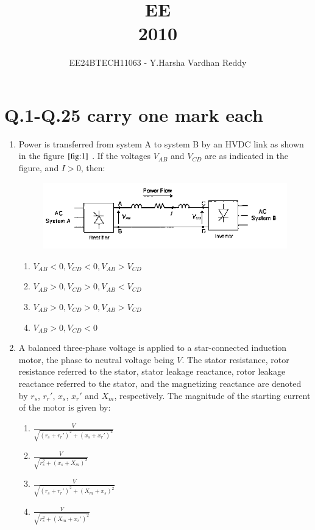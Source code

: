 \documentclass[journal]{IEEEtran}
\renewcommand{\thefigure}{\theenumi}
\renewcommand{\thetable}{\theenumi}
\numberwithin{equation}{enumi}
\numberwithin{figure}{enumi}
\renewcommand{\thetable}{\theenumi}
\begin{document}

\vspace{3cm}

\title{EE\\2010}
\author{EE24BTECH11063 - Y.Harsha Vardhan Reddy}
\maketitle

\bigskip

\renewcommand{\thefigure}{\theenumi}
\renewcommand{\thetable}{\theenumi}

\section*{Q.1-Q.25 carry one mark each}

    \begin{enumerate}
    \item Power is transferred from system A to system B by an HVDC link as shown in the figure $\ref{fig:1}$ . If the voltages $V_{AB}$ and $V_{CD}$ are as indicated in the figure, and $I > 0$, then:
    	\begin{figure}[!ht]
    \centering
    \includegraphics[width=\linewidth]{figs/14.png}
    \caption{}
    \label{fig:1}
    \end{figure}
    \begin{enumerate}
        \item $V_{AB} < 0, V_{CD} < 0, V_{AB} > V_{CD}$
        \item $V_{AB} > 0, V_{CD} > 0, V_{AB} < V_{CD}$
        \item $V_{AB} > 0, V_{CD} > 0, V_{AB} > V_{CD}$
        \item $V_{AB} > 0, V_{CD} < 0$
    \end{enumerate}

    \item A balanced three-phase voltage is applied to a star-connected induction motor, the phase to neutral voltage being $V$. The stator resistance, rotor resistance referred to the stator, stator leakage reactance, rotor leakage reactance referred to the stator, and the magnetizing reactance are denoted by $r_s$, $r_r'$, $x_s$, $x_r'$ and $X_m$, respectively. The magnitude of the starting current of the motor is given by:
    \begin{enumerate}
        \item $\frac{V}{\sqrt{(r_s + r_r')^2 + (x_s + x_r')^2}}$
        \item $\frac{V}{\sqrt{r_s^2 + (x_s + X_m)^2}}$
        \item $\frac{V}{\sqrt{(r_s + r_r')^2 + (X_m + x_s)^2}}$
        \item $\frac{V}{\sqrt{r_s^2 + (X_m + x_r')^2}}$
    \end{enumerate}


\end{enumerate}
\end{document}
